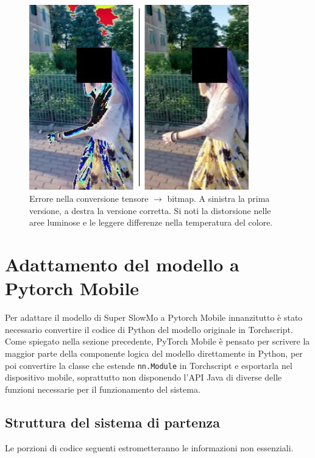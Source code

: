 \begin{figure}[!bh]
    \centering
    \includegraphics[width=0.85\textwidth]{img/conversione_img_errore.jpg}
    \caption{Errore nella conversione tensore $\rightarrow$ bitmap. A sinistra la prima versione, 
    a destra la versione corretta. Si noti la distorsione nelle aree luminose e le leggere
    differenze nella temperatura del colore.}
    \label{fig:img_conversion_error}
\end{figure}


\FloatBarrier

\section{Adattamento del modello a Pytorch Mobile}

Per adattare il modello di Super SlowMo a Pytorch Mobile innanzitutto è 
stato necessario convertire il codice di Python del modello originale in
Torchscript. Come spiegato nella sezione precedente, PyTorch Mobile è pensato
per scrivere la maggior parte della componente logica del modello direttamente in Python, 
per poi convertire la classe che estende \texttt{nn.Module} in Torchscript e esportarla nel
dispositivo mobile, soprattutto non disponendo l'API Java di diverse delle funzioni necessarie
per il funzionamento del sistema. 

\subsection{Struttura del sistema di partenza}

Le porzioni di codice seguenti estrometteranno le informazioni non essenziali.

